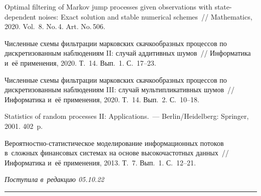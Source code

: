 \begin{multicols}{2}
{{\begin{thebibliography}{99}
  Optimal filtering of Markov jump processes given observations with state-dependent noises: Exact 
 solution and stable numerical schemes~// Mathematics, 2020. Vol.~8. No.\,4. Art. No.\,506.



 Численные схемы фильтрации марковских скачкообразных процессов по дискретизованным наблюдениям II: случай аддитивных шумов~// 
Информатика и~её применения, 2020. Т.~14. Вып.~1. С.~17--23.

 Численные схемы фильт\-ра\-ции марковских скачкообразных процессов по дискретизованным наблюдениям III: случай мультипликативных шумов~// 
Информатика и~её применения, 2020. Т.~14. Вып.~2. С.~10--18.

  Statistics of random processes II: Applications.~--- Berlin/Heidelberg: Springer, 2001. 402~p.

Ве\-ро\-ят\-ност\-но-ста\-ти\-сти\-че\-ское моделирование информационных потоков в~слож\-ных финансовых сис\-те\-мах 
на основе высокочастотных данных~// Информатика и~её применения, 2013. Т.~7. Вып.~1. С.~12--21.
\end{thebibliography}

 }
 }

\end{multicols}

\vspace*{-6pt}

\hfill{\small\textit{Поступила в~редакцию 05.10.22}}

\vspace*{8pt}




\hrule

\vspace*{2pt}

